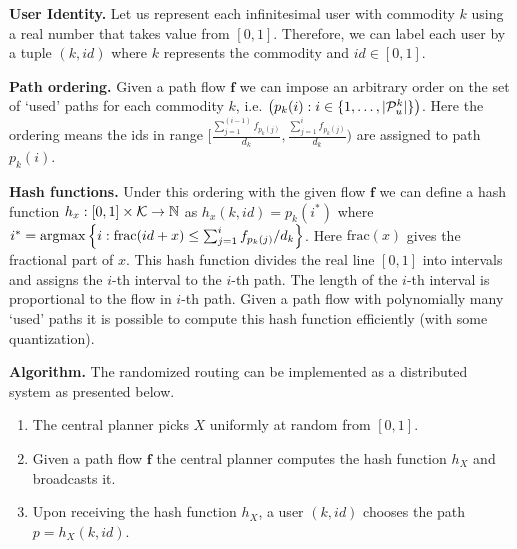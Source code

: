 \textbf{User Identity.}  Let us represent each infinitesimal user with commodity $k$ using a real number that takes value from $[0,1]$. Therefore, we can label each user by a tuple $(k,id)$ where $k$ represents the commodity and $id\in[0,1]$. 

\textbf{Path ordering.} Given a path flow $\bm{f}$ we can impose an arbitrary order on the set of `used' paths for each commodity $k$, i.e. $\left(p_k(i) : i \in \{1, \dots, |\mathcal{P}^k_{u}|\}\right)$. Here the ordering means the ids in range $\Big[\frac{\sum_{j=1}^{(i-1)} f_{p_k(j)}}{d_k}, \frac{\sum_{j=1}^{i} f_{p_k(j)}}{d_k}\Big)$ are assigned to path $p_k(i)$. 

\textbf{Hash functions.} Under this ordering with the given flow $\bm{f}$ we can define a hash function $h_x: [0,1]\times\mathcal{K}\rightarrow \mathbb{N}$ as $h_x(k,id)= p_k(i^*)$ where $i^* = \mathrm{argmax}\left\{i:  \text{frac}(id+x) \leq \sum_{j=1}^{i} f_{p_k(j)}/ d_k \right\}$. Here $\text{frac}(x)$ gives the fractional part of $x$. This hash function divides the real line $[0,1]$ into intervals and assigns the $i$-th interval to the $i$-th path. The length of the $i$-th interval is proportional to the flow in $i$-th path. Given a path flow with polynomially many `used' paths it is possible to compute this hash function efficiently (with some quantization).  
 
\textbf{Algorithm.} The randomized routing can be implemented as a distributed system as presented below.
\begin{enumerate}
\item The central planner picks $X$ uniformly at random from $[0,1]$.
\item Given a path flow $\bm{f}$ the central planner computes the hash function $h_X$ and broadcasts it. 
\item Upon receiving the hash function $h_X$, a user $(k,id)$ chooses the path $p = h_X(k,id)$.
\end{enumerate}
 

